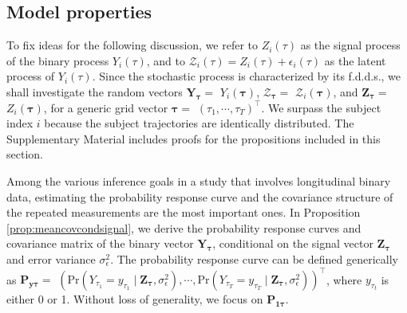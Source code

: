 \subsection{Model properties}
\label{subsec:modprop}

To fix ideas for the following discussion, we refer to $Z_i(\tau)$ as the signal process of 
the binary process $Y_i(\tau)$, and to $\mathcal{Z}_i(\tau)=Z_i(\tau)+\epsilon_i(\tau)$ as 
the latent process of $Y_i(\tau)$. Since the stochastic process is characterized by its 
f.d.d.s., we shall investigate the random vectors $\mathbf{Y}_{\boldsymbol{\tau}}=$
$Y_i(\boldsymbol{\tau})$, $\boldsymbol{\mathcal{Z}}_{\boldsymbol{\tau}}=$
$\mathcal{Z}_{i}(\boldsymbol{\tau})$, and $\mathbf{Z}_{\boldsymbol{\tau}}=$
$Z_{i}(\boldsymbol{\tau})$, for a generic grid vector $\boldsymbol{\tau}=$
$(\tau_1,\cdots,\tau_T)^{\top}$. We surpass the subject index $i$ because the subject 
trajectories are identically distributed. The Supplementary Material includes 
proofs for the propositions included in this section. 


Among the various inference goals in a study that involves longitudinal binary data, 
estimating the probability response curve and the covariance structure of the repeated 
measurements are the most important ones.  In Proposition \ref{prop:meancovcondsignal}, 
we derive the probability response curves and covariance matrix of the binary 
vector $\mathbf{Y}_{\boldsymbol{\tau}}$, conditional on the signal vector
$\mathbf{Z}_{\boldsymbol{\tau}}$ and error variance $\sigma^2_{\epsilon}$. 
The probability response curve can be defined generically 
as $\mathbf{P}_{\mathbf{y}\boldsymbol{\tau}} =$
$(\text{Pr}(Y_{\tau_1}=y_{\tau_1}\mid \mathbf{Z}_{\boldsymbol{\tau}},\sigma_{\epsilon}^2),
\cdots,\text{Pr}(Y_{\tau_T}=y_{\tau_T}\mid \mathbf{Z}_{\boldsymbol{\tau}},
\sigma_{\epsilon}^2) )^{\top}$, where $y_{\tau_t}$ is either 0 or 1. 
Without loss of generality, we focus on $\mathbf{P}_{\mathbf{1}\boldsymbol{\tau}}$.


